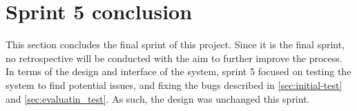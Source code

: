 \section{Sprint 5 conclusion}\label{sec:sprint5-conclusion}
This section concludes the final sprint of this project.
Since it is the final sprint, no retrospective will be conducted with the aim to further improve the process.
In terms of the design and interface of the system, sprint 5 focused on testing the system to find potential issues, and fixing the bugs described in \autoref{sec:initial-test} and \autoref{sec:evaluatin_test}.
As such, the design was unchanged this sprint.
